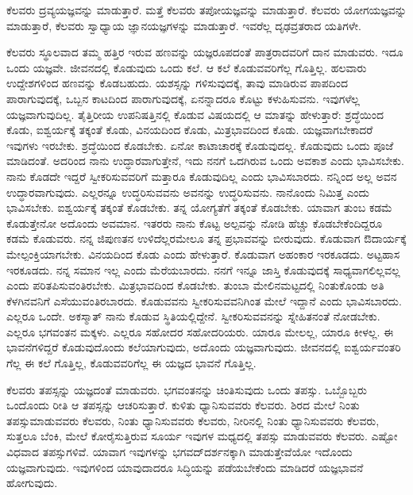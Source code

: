 \newpage

\begin{artha}
ಕೆಲವರು ದ್ರವ್ಯಯಜ್ಞವನ್ನು ಮಾಡುತ್ತಾರೆ. ಮತ್ತೆ ಕೆಲವರು ತಪೋಯಜ್ಞವನ್ನು ಮಾಡುತ್ತಾರೆ. ಕೆಲವರು ಯೋಗಯಜ್ಞವನ್ನು ಮಾಡುತ್ತಾರೆ, ಕೆಲವರು ಸ್ವಾಧ್ಯಾಯ ಜ್ಞಾನಯಜ್ಞಗಳನ್ನು ಮಾಡುತ್ತಾರೆ. ಇವರೆಲ್ಲ ದೃಢವ್ರತರಾದ ಯತಿಗಳೇ.
\end{artha}

ಕೆಲವರು ಸ್ಥೂಲವಾದ ತಮ್ಮ ಹತ್ತಿರ ಇರುವ ಹಣವನ್ನು ಯಜ್ಞರೂಪದಂತೆ ಪಾತ್ರರಾದವರಿಗೆ ದಾನ ಮಾಡುವರು. ಇದೂ ಒಂದು ಯಜ್ಞವೇ. ಜೀವನದಲ್ಲಿ ಕೊಡುವುದು ಒಂದು ಕಲೆ. ಆ ಕಲೆ ಕೊಡುವವರಿಗೆಲ್ಲ ಗೊತ್ತಿಲ್ಲ. ಹಲವಾರು ಉದ್ದೇಶಗಳಿಂದ ಹಣವನ್ನು ಕೊಡಬಹುದು. ಯಶಸ್ಸನ್ನು ಗಳಿಸುವುದಕ್ಕೆ, ತಾವು ಮಾಡಿರುವ ಪಾಪದಿಂದ ಪಾರಾಗುವುದಕ್ಕೆ, ಒಬ್ಬನ ಕಾಟದಿಂದ ಪಾರಾಗುವುದಕ್ಕೆ, ಏನನ್ನಾದರೂ ಕೊಟ್ಟು ಕಳುಹಿಸುವನು. ಇವುಗಳೆಲ್ಲ ಯಜ್ಞವಾಗುವುದಿಲ್ಲ. ತೈತ್ತಿರೀಯ ಉಪನಿಷತ್ತಿನಲ್ಲಿ ಕೊಡುವ ವಿಷಯದಲ್ಲಿ ಆ ಮಾತನ್ನು ಹೇಳುತ್ತಾರೆ: ಶ್ರದ್ಧೆಯಿಂದ ಕೊಡು, ಐಶ್ವರ್ಯಕ್ಕೆ ತಕ್ಕಂತೆ ಕೊಡು, ವಿನಯದಿಂದ ಕೊಡು, ಮಿತ್ರಭಾವದಿಂದ ಕೊಡು. ಯಜ್ಞವಾಗಬೇಕಾದರೆ ಇವುಗಳು ಇರಬೇಕು. ಶ್ರದ್ಧೆಯಿಂದ ಕೊಡಬೇಕು. ಏನೋ ಕಾಟಾಚಾರಕ್ಕೆ ಕೊಡುವುದಲ್ಲ. ಕೊಡುವುದು ಒಂದು ಪೂಜೆ ಮಾಡಿದಂತೆ. ಅದರಿಂದ ನಾನು ಉದ್ಧಾರವಾಗುತ್ತೇನೆ, ಇದು ನನಗೆ ಒದಗಿರುವ ಒಂದು ಅವಕಾಶ ಎಂದು ಭಾವಿಸಬೇಕು. ನಾನು ಕೊಡದೇ ಇದ್ದರೆ ಸ್ವೀಕರಿಸುವವರಿಗೆ ಮತ್ತಾರೂ ಕೊಡುವುದಿಲ್ಲ ಎಂದು ಭಾವಿಸಬಾರದು. ನನ್ನಿಂದ ಅಲ್ಲ ಅವನ ಉದ್ಧಾರವಾಗುವುದು. ಎಲ್ಲರನ್ನೂ ಉದ್ಧರಿಸುವವನು ಅವನನ್ನು ಉದ್ಧರಿಸುವನು. ನಾನೊಂದು ನಿಮಿತ್ತ ಎಂದು ಭಾವಿಸಬೇಕು. ಐಶ್ವರ್ಯಕ್ಕೆ ತಕ್ಕಂತೆ ಕೊಡಬೇಕು. ತನ್ನ ಯೋಗ್ಯತೆಗೆ ತಕ್ಕಂತೆ ಕೊಡಬೇಕು. ಯಾವಾಗ ತುಂಬ ಕಡಮೆ ಕೊಡುತ್ತೇನೋ ಅದೊಂದು ಅವಮಾನ. ಇತರರು ನಾನು ಕೊಟ್ಟ ಅಲ್ಪವನ್ನು ನೋಡಿ ಹೆಚ್ಚು ಕೊಡಬೇಕೆಂದಿದ್ದರೂ ಕಡಮೆ ಕೊಡುವರು. ನನ್ನ ಜಿಪುಣತನ ಉಳಿದೆಲ್ಲರಮೇಲೂ ತನ್ನ ಪ್ರಭಾವವನ್ನು ಬೀರುವುದು. ಕೊಡುವಾಗ ಔದಾರ್ಯಕ್ಕೆ ಮೇಲ್ಪಂಕ್ತಿಯಾಗಬೇಕು. ವಿನಯದಿಂದ ಕೊಡು ಎಂದು ಹೇಳುತ್ತಾರೆ. ಕೊಡುವಾಗ ಅಹಂಕಾರ ಇರಕೂಡದು. ಅಟ್ಟಹಾಸ ಇರಕೂಡದು. ನನ್ನ ಸಮಾನ ಇಲ್ಲ ಎಂದು ಮೆರೆಯಬಾರದು. ನನಗೆ ಇನ್ನೂ ಜಾಸ್ತಿ ಕೊಡುವುದಕ್ಕೆ ಸಾಧ್ಯವಾಗಲಿಲ್ಲವಲ್ಲ ಎಂದು ಪರಿತಪಿಸುವಂತಿರಬೇಕು. ಮಿತ್ರಭಾವದಿಂದ ಕೊಡಬೇಕು. ತುಂಬಾ ಮೇಲಿನಮಟ್ಟದಲ್ಲಿ ನಿಂತುಕೊಂಡು ಅತಿ ಕೆಳಗಿನವನಿಗೆ ಎಸೆಯು\-ವಂತಿರಬಾರದು. ಕೊಡುವವನು ಸ್ವೀಕರಿಸುವವನಿಗಿಂತ ಮೇಲೆ ಇದ್ದಾನೆ ಎಂದು ಭಾವಿಸಬಾರದು. ಎಲ್ಲರೂ ಒಂದೇ. ಅಕಸ್ಮಾತ್ ನಾನು ಕೊಡುವ ಸ್ಥಿತಿಯಲ್ಲಿದ್ದೇನೆ. ಸ್ವೀಕರಿಸುವವನನ್ನು ಸ್ನೇಹಿತನಂತೆ ನೋಡಬೇಕು. ಎಲ್ಲರೂ ಭಗವಂತನ ಮಕ್ಕಳು. ಎಲ್ಲರೂ ಸಹೋದರ ಸಹೋದರಿಯರು. ಯಾರೂ ಮೇಲಲ್ಲ, ಯಾರೂ ಕೀಳಲ್ಲ. ಈ ಭಾವನೆಗಳಿದ್ದರೆ ಕೊಡುವುದೊಂದು ಕಲೆಯಾಗುವುದು, ಅದೊಂದು ಯಜ್ಞವಾಗುವುದು. ಜೀವನದಲ್ಲಿ ಐಶ್ವರ್ಯವಂತರಿ ಗೆಲ್ಲ ಈ ಕಲೆ ಗೊತ್ತಿಲ್ಲ, ಕೊಡುವವರಿಗೆಲ್ಲ ಈ ಯಜ್ಞದ ಭಾವನೆ ಗೊತ್ತಿಲ್ಲ.

\newpage

ಕೆಲವರು ತಪಸ್ಸನ್ನು ಯಜ್ಞದಂತೆ ಮಾಡುವರು. ಭಗವಂತನನ್ನು ಚಿಂತಿಸುವುದು ಒಂದು ತಪಸ್ಸು. ಒಬ್ಬೊಬ್ಬರು ಒಂದೊಂದು ರೀತಿ ಆ ತಪಸ್ಸನ್ನು ಆಚರಿಸುತ್ತಾರೆ. ಕುಳಿತು ಧ್ಯಾನಿಸುವವರು ಕೆಲವರು. ಶಿರದ ಮೇಲೆ ನಿಂತು ತಪಸ್ಸುಮಾಡುವವರು ಕೆಲವರು, ನಿಂತು ಧ್ಯಾನಿಸುವವರು ಕೆಲವರು, ನೀರಿನಲ್ಲಿ ನಿಂತು ಧ್ಯಾನಿಸುವವರು ಕೆಲವರು, ಸುತ್ತಲೂ ಬೆಂಕಿ, ಮೇಲೆ ಕೋರೈಸುತ್ತಿರುವ ಸೂರ್ಯ ಇವುಗಳ ಮಧ್ಯದಲ್ಲಿ ತಪಸ್ಸು ಮಾಡುವವರು ಕೆಲವರು. ಎಷ್ಟೋ ವಿಧವಾದ ತಪಸ್ಸುಗಳಿವೆ. ಯಾವಾಗ ಇವುಗಳನ್ನು ಭಗವದ್​ದರ್ಶನಕ್ಕಾಗಿ ಮಾಡುತ್ತೇವೆಯೋ ಇದೊಂದು ಯಜ್ಞವಾಗುವುದು. ಇವುಗಳಿಂದ ಯಾವುದಾದರೂ ಸಿದ್ಧಿಯನ್ನು ಪಡೆಯಬೇಕೆಂದು ಮಾಡಿದರೆ ಯಜ್ಞಭಾವನೆ ಹೋಗುವುದು.

